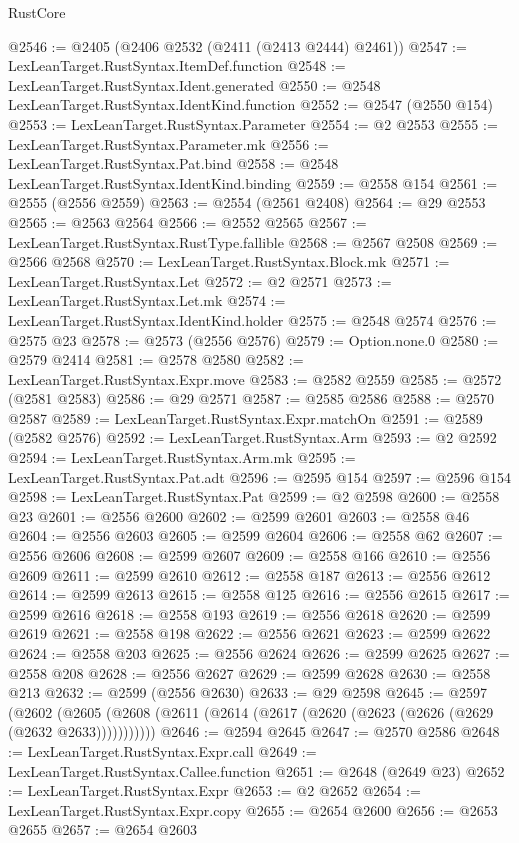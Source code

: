 \begin{lexlean}{RustCore}
\begin{coremodule}
@2546 := @2405 (@2406 @2532 (@2411 (@2413 @2444) @2461))
@2547 := LexLeanTarget.RustSyntax.ItemDef.function
@2548 := LexLeanTarget.RustSyntax.Ident.generated
@2550 := @2548 LexLeanTarget.RustSyntax.IdentKind.function
@2552 := @2547 (@2550 @154)
@2553 := LexLeanTarget.RustSyntax.Parameter
@2554 := @2 @2553
@2555 := LexLeanTarget.RustSyntax.Parameter.mk
@2556 := LexLeanTarget.RustSyntax.Pat.bind
@2558 := @2548 LexLeanTarget.RustSyntax.IdentKind.binding
@2559 := @2558 @154
@2561 := @2555 (@2556 @2559)
@2563 := @2554 (@2561 @2408)
@2564 := @29 @2553
@2565 := @2563 @2564
@2566 := @2552 @2565
@2567 := LexLeanTarget.RustSyntax.RustType.fallible
@2568 := @2567 @2508
@2569 := @2566 @2568
@2570 := LexLeanTarget.RustSyntax.Block.mk
@2571 := LexLeanTarget.RustSyntax.Let
@2572 := @2 @2571
@2573 := LexLeanTarget.RustSyntax.Let.mk
@2574 := LexLeanTarget.RustSyntax.IdentKind.holder
@2575 := @2548 @2574
@2576 := @2575 @23
@2578 := @2573 (@2556 @2576)
@2579 := Option.none.{0}
@2580 := @2579 @2414
@2581 := @2578 @2580
@2582 := LexLeanTarget.RustSyntax.Expr.move
@2583 := @2582 @2559
@2585 := @2572 (@2581 @2583)
@2586 := @29 @2571
@2587 := @2585 @2586
@2588 := @2570 @2587
@2589 := LexLeanTarget.RustSyntax.Expr.matchOn
@2591 := @2589 (@2582 @2576)
@2592 := LexLeanTarget.RustSyntax.Arm
@2593 := @2 @2592
@2594 := LexLeanTarget.RustSyntax.Arm.mk
@2595 := LexLeanTarget.RustSyntax.Pat.adt
@2596 := @2595 @154
@2597 := @2596 @154
@2598 := LexLeanTarget.RustSyntax.Pat
@2599 := @2 @2598
@2600 := @2558 @23
@2601 := @2556 @2600
@2602 := @2599 @2601
@2603 := @2558 @46
@2604 := @2556 @2603
@2605 := @2599 @2604
@2606 := @2558 @62
@2607 := @2556 @2606
@2608 := @2599 @2607
@2609 := @2558 @166
@2610 := @2556 @2609
@2611 := @2599 @2610
@2612 := @2558 @187
@2613 := @2556 @2612
@2614 := @2599 @2613
@2615 := @2558 @125
@2616 := @2556 @2615
@2617 := @2599 @2616
@2618 := @2558 @193
@2619 := @2556 @2618
@2620 := @2599 @2619
@2621 := @2558 @198
@2622 := @2556 @2621
@2623 := @2599 @2622
@2624 := @2558 @203
@2625 := @2556 @2624
@2626 := @2599 @2625
@2627 := @2558 @208
@2628 := @2556 @2627
@2629 := @2599 @2628
@2630 := @2558 @213
@2632 := @2599 (@2556 @2630)
@2633 := @29 @2598
@2645 := @2597
    (@2602 (@2605 (@2608 (@2611 (@2614 (@2617 (@2620 (@2623 (@2626 (@2629 (@2632 @2633)))))))))))
@2646 := @2594 @2645
@2647 := @2570 @2586
@2648 := LexLeanTarget.RustSyntax.Expr.call
@2649 := LexLeanTarget.RustSyntax.Callee.function
@2651 := @2648 (@2649 @23)
@2652 := LexLeanTarget.RustSyntax.Expr
@2653 := @2 @2652
@2654 := LexLeanTarget.RustSyntax.Expr.copy
@2655 := @2654 @2600
@2656 := @2653 @2655
@2657 := @2654 @2603

\end{coremodule}
\end{lexlean}

